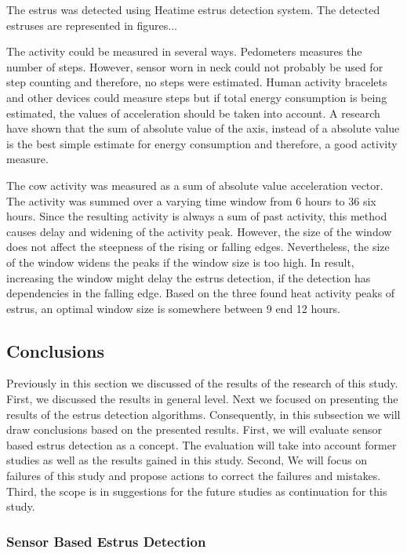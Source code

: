 \documentclass[english,12pt,a4paper,pdftex,elec,utf8]{aaltothesis}
\begin{document}
The estrus was detected using Heatime estrus detection system. The detected estruses are represented in figures...



The activity could be measured in several ways. Pedometers measures the number of steps. However, sensor worn in neck could not probably be used for step counting and therefore, no steps were estimated. Human activity bracelets and other devices could measure steps but if total energy consumption is being estimated, the values of acceleration should be taken into account. A research have shown that the sum of absolute value of the axis, instead of a absolute value is the best simple estimate for energy consumption and therefore, a good activity measure.

The cow activity was measured as a sum of absolute value acceleration vector. The activity was summed over a varying time window from 6 hours to 36 six hours. Since the resulting activity is always a sum of past activity, this method causes delay and widening of the activity peak. However, the size of the window does not affect the steepness of the rising or falling edges. Nevertheless, the size of the window widens the peaks if the window size is too high. In result, increasing the window might delay the estrus detection, if the detection has dependencies in the falling edge. Based on the three found heat activity peaks of estrus, an optimal window size is somewhere between 9 end 12 hours.



\subsection{Conclusions} \label{conclusionssection}

Previously in this section we discussed of the results of the research of this study. First, we discussed the results in general level. Next we focused on presenting the results of the estrus detection algorithms. Consequently, in this subsection we will draw conclusions based on the presented results. First, we will evaluate sensor based estrus detection as a concept. The evaluation will take into account former studies as well as the results gained in this study. Second, We will focus on failures of this study and propose actions to correct the failures and mistakes. Third, the scope is in suggestions for the future studies as continuation for this study.

\subsubsection{Sensor Based Estrus Detection}
\end{document}
